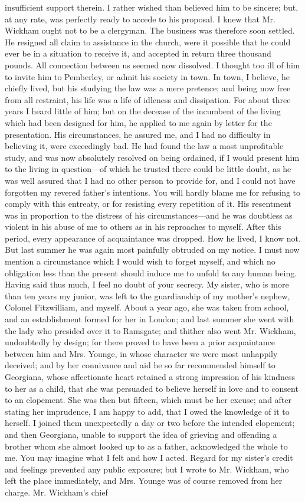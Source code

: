 \documentclass[12pt]{book}
\begin{document}
insufficient support therein. I rather wished than believed him to be sincere; but, at any rate, was perfectly ready to accede to his proposal. I knew that Mr. Wickham ought not to be a clergyman. The business was therefore soon settled. He resigned all claim to assistance in the church, were it possible that he could ever be in a situation to receive it, and accepted in return three thousand pounds. All connection between us seemed now dissolved. I thought too ill of him to invite him to Pemberley, or admit his society in town. In town, I believe, he chiefly lived, but his studying the law was a mere pretence; and being now free from all restraint, his life was a life of idleness and dissipation. For about three years I heard little of him; but on the decease of the incumbent of the living which had been designed for him, he applied to me again by letter for the presentation. His circumstances, he assured me, and I had no difficulty in believing it, were exceedingly bad. He had found the law a most unprofitable study, and was now absolutely resolved on being ordained, if I would present him to the living in question---of which he trusted there could be little doubt, as he was well assured that I had no other person to provide for, and I could not have forgotten my revered father's intentions. You will hardly blame me for refusing to comply with this entreaty, or for resisting every repetition of it. His resentment was in proportion to the distress of his circumstances---and he was doubtless as violent in his abuse of me to others as in his reproaches to myself. After this period, every appearance of acquaintance was dropped. How he lived, I know not. But last summer he was again most painfully obtruded on my notice. I must now mention a circumstance which I would wish to forget myself, and which no obligation less than the present should induce me to unfold to any human being. Having said thus much, I feel no doubt of your secrecy. My sister, who is more than ten years my junior, was left to the guardianship of my mother's nephew, Colonel Fitzwilliam, and myself. About a year ago, she was taken from school, and an establishment formed for her in London; and last summer she went with the lady who presided over it to Ramsgate; and thither also went Mr. Wickham, undoubtedly by design; for there proved to have been a prior acquaintance between him and Mrs. Younge, in whose character we were most unhappily deceived; and by her connivance and aid he so far recommended himself to Georgiana, whose affectionate heart retained a strong impression of his kindness to her as a child, that she was persuaded to believe herself in love and to consent to an elopement. She was then but fifteen, which must be her excuse; and after stating her imprudence, I am happy to add, that I owed the knowledge of it to herself. I joined them unexpectedly a day or two before the intended elopement; and then Georgiana, unable to support the idea of grieving and offending a brother whom she almost looked up to as a father, acknowledged the whole to me. You may imagine what I felt and how I acted. Regard for my sister's credit and feelings prevented any public exposure; but I wrote to Mr. Wickham, who left the place immediately, and Mrs. Younge was of course removed from her charge. Mr. Wickham's chief 
\end{document}
